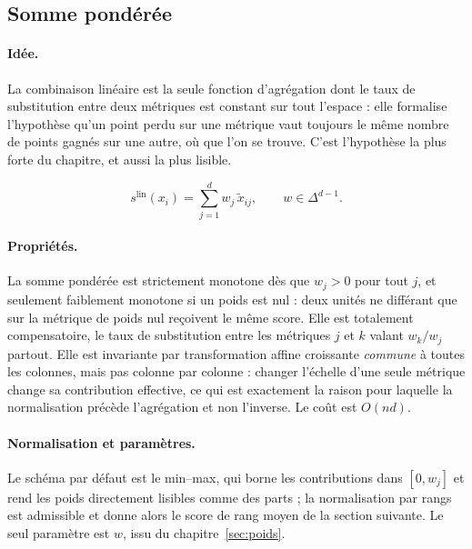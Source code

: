 \documentclass[11pt,a4paper]{article}
\theoremstyle{definition}
\theoremstyle{remark}
\newcommand{\simplex}{\Delta^{d-1}}
\begin{document}
\subsection{Somme pondérée}
\label{sec:somme}

\medskip

\paragraph{Idée.} La combinaison linéaire est la seule fonction d'agrégation dont le taux
de substitution entre deux métriques est constant sur tout l'espace : elle formalise
l'hypothèse qu'un point perdu sur une métrique vaut toujours le même nombre de points
gagnés sur une autre, où que l'on se trouve. C'est l'hypothèse la plus forte du chapitre,
et aussi la plus lisible.

\medskip

\[
  s^{\mathrm{lin}}(x_i) = \sum_{j=1}^{d} w_j\,\tilde{x}_{ij},
  \qquad w \in \simplex .
\]

\bigskip

\paragraph{Propriétés.} La somme pondérée est strictement monotone dès que $w_j > 0$ pour
tout $j$, et seulement faiblement monotone si un poids est nul : deux unités ne différant
que sur la métrique de poids nul reçoivent le même score. Elle est totalement
compensatoire, le taux de substitution entre les métriques $j$ et $k$ valant $w_k/w_j$
partout. Elle est invariante par transformation affine croissante \emph{commune} à toutes
les colonnes, mais pas colonne par colonne : changer l'échelle d'une seule métrique change
sa contribution effective, ce qui est exactement la raison pour laquelle la normalisation
précède l'agrégation et non l'inverse. Le coût est $O(nd)$.

\bigskip

\paragraph{Normalisation et paramètres.} Le schéma par défaut est le min--max, qui borne
les contributions dans $[0, w_j]$ et rend les poids directement lisibles comme des parts ;
la normalisation par rangs est admissible et donne alors le score de rang moyen de la
section suivante. Le seul paramètre est $w$, issu du chapitre~\ref{sec:poids}.

\medskip
\end{document}
